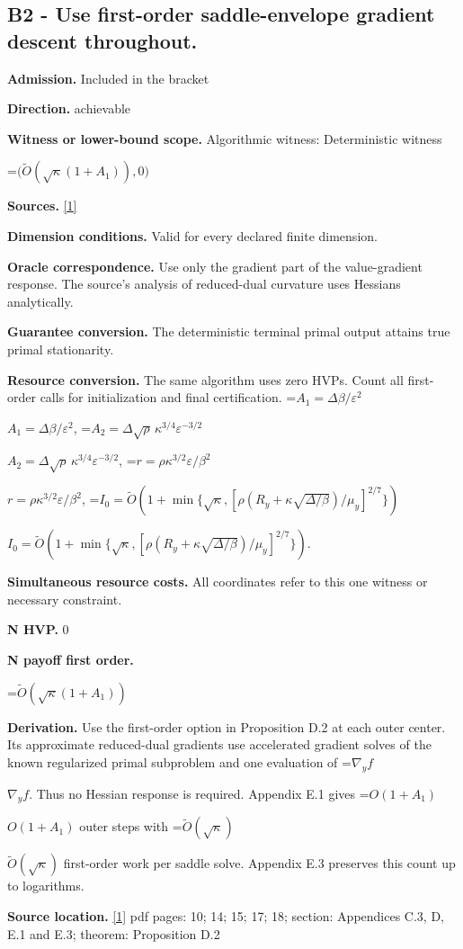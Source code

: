 \documentclass[10pt,a4paper]{article}
\newcommand{\AtlasMath}[1]{\par\begingroup\centering\setbox0=\hbox{$\displaystyle #1$}\ifdim\wd0>1.4\linewidth\typeout{ATLAS WIDE FORMULA: \the\wd0}\fi\ifdim\wd0>\linewidth\resizebox{\linewidth}{!}{\box0}\else\box0\fi\par\endgroup}
\newcommand{\AtlasInlineMath}[1]{\begingroup\setbox0=\hbox{$#1$}\ifdim\wd0>.4\linewidth\endgroup\AtlasMath{#1}\else\endgroup$#1$\fi}
\begin{document}
\subsection{B2 - Use first-order saddle-envelope gradient descent throughout.}
\textbf{Admission.} Included in the bracket

\textbf{Direction.} achievable

\textbf{Witness or lower-bound scope.} Algorithmic witness: Deterministic witness

\AtlasMath{\bigl(\widetilde O(\sqrt\kappa(1+A_1)),0\bigr)}
\textbf{Sources.} \href{https://arxiv.org/pdf/2610.16771v2}{[1]}

\textbf{Dimension conditions.} Valid for every declared finite dimension.

\textbf{Oracle correspondence.} Use only the gradient part of the value-gradient response. The source's analysis of reduced-dual curvature uses Hessians analytically.

\textbf{Guarantee conversion.} The deterministic terminal primal output attains true primal stationarity.

\textbf{Resource conversion.} The same algorithm uses zero HVPs. Count all first-order calls for initialization and final certification. \AtlasInlineMath{A_1=\Delta\beta/\varepsilon^2}, \AtlasInlineMath{A_2=\Delta\sqrt{\rho}\,\kappa^{3/4}\varepsilon^{-3/2}}, \AtlasInlineMath{r=\rho\kappa^{3/2}\varepsilon/\beta^2}, \AtlasInlineMath{I_0=\widetilde O\!\left(1+\min\{\sqrt{\kappa},[\rho(R_y+\kappa\sqrt{\Delta/\beta})/\mu_y]^{2/7}\}\right)}.

\textbf{Simultaneous resource costs.} All coordinates refer to this one witness or necessary constraint.

\textbf{N HVP.} 0

\textbf{N payoff first order.}

\AtlasMath{\widetilde O(\sqrt\kappa(1+A_1))}
\textbf{Derivation.} Use the first-order option in Proposition D.2 at each outer center. Its approximate reduced-dual gradients use accelerated gradient solves of the known regularized primal subproblem and one evaluation of \AtlasInlineMath{\nabla_y f}. Thus no Hessian response is required. Appendix E.1 gives \AtlasInlineMath{O(1+A_1)} outer steps with \AtlasInlineMath{\widetilde O(\sqrt\kappa)} first-order work per saddle solve. Appendix E.3 preserves this count up to logarithms.

\textbf{Source location.} \href{https://arxiv.org/pdf/2610.16771v2}{[1]} pdf pages: 10; 14; 15; 17; 18; section: Appendices C.3, D, E.1 and E.3; theorem: Proposition D.2
\end{document}
